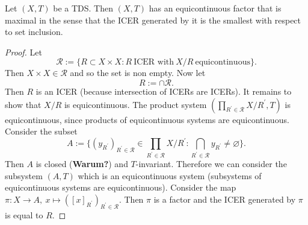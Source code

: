 \begin{theorem}
  Let $(X,T)$ be a TDS.
  Then $(X,T)$ has an equicontinuous factor that is maximal in the sense that the ICER generated by it is the smallest with respect to set inclusion.
\end{theorem}
\begin{proof}
  Let
  \begin{equation*}
    \mathcal{R} := \{ R \subset X \times X : R \ \text{ICER with} \ X/R \ \text{equicontinuous}\}.
  \end{equation*}
  Then $ X \times X \in \mathcal{R}$ and so the set is non empty.
  Now let 
  \begin{equation*}
    R:= \cap \mathcal{R}.
  \end{equation*}
  Then $R$ is an ICER (because intersection of ICERs are ICERs).
  It remains to show that $X/R$ is equicontinuous.
  The product system $(\prod_{R^\prime \in \mathcal{R}} X/R^\prime,T)$ is equicontinuous, since products of equicontinuous systems are equicontinuous.
  Consider the subset
  \begin{equation*}
    A:=   
 \bigg\{ (y_{R^\prime})_{R^\prime \in \mathcal{R}} \in \prod_{R^\prime \in \mathcal{R}} X/R^\prime : \bigcap_{R^\prime \in \mathcal{R}} y_{R^\prime} \neq \varnothing \bigg \}.
  \end{equation*}
  Then $A$ is closed (\textbf{Warum?}) and $T$-invariant.
  Therefore we can consider the subsystem $(A,T)$ which is an equicontinuous system (subsystems of equicontinuous systems are equicontinuous).
  Consider the map $\pi: X \to  A , \  x  \mapsto ([x]_{R^\prime})_{R^\prime \in \mathcal{R}}$.
  Then $\pi$ is a factor and the ICER generated by $\pi$ is equal to $R$.
\end{proof}
